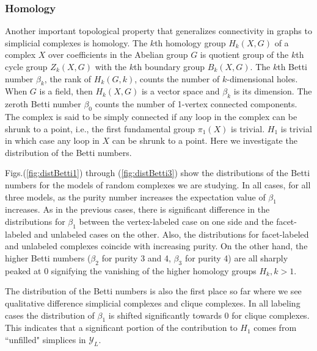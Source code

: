 \documentclass[12pt]{article}
\theoremstyle{plain}
\theoremstyle{definition}
\theoremstyle{remark}
\begin{document}
\subsubsection{Homology}
Another important topological property that generalizes connectivity in graphs to simplicial complexes is homology. The $k$th homology group $H_k(X,G)$ of a complex $X$ over coefficients in the Abelian group $G$ is quotient group of the $k$th cycle group $Z_k(X,G)$ with the $k$th boundary group $B_k(X,G)$. The $k$th Betti number $\beta_k$, the rank of $H_k(G,k)$, counts the number of $k$-dimensional holes. When $G$ is a field, then $H_k(X,G)$ is a vector space and $\beta_k$ is its dimension. The zeroth Betti number $\beta_0$ counts the number of 1-vertex connected components. The complex is said to be simply connected if any loop in the complex can be shrunk to a point, i.e., the first fundamental group $\pi_1(X)$ is trivial. $H_1$ is trivial in which case any loop in $X$ can be shrunk to a point. Here we investigate the distribution of the Betti numbers. %

Figs.(\ref{fig:distBetti1}) through (\ref{fig:distBetti3}) show the distributions of the Betti numbers for the models of random complexes we are studying. In all cases, for all three models, as the purity number increases the expectation value of $\beta_1$ increases. As in the previous cases, there is significant difference in the distributions for $\beta_1$ between the vertex-labeled case on one side and the facet-labeled and unlabeled cases on the other. Also, the distributions for facet-labeled and unlabeled complexes coincide with increasing purity. On the other hand, the higher Betti numbers ($\beta_2$ for purity 3 and 4, $\beta_3$ for purity 4) are all sharply peaked at 0 signifying the vanishing of the higher homology groups $H_k, k>1$. 

The distribution of the Betti numbers is also the first place so far where we see qualitative difference  simplicial complexes and clique complexes. In all labeling cases the distribution of $\beta_1$ is shifted significantly towards 0 for clique complexes. This indicates that a significant portion of the contribution to $H_1$ comes from ``unfilled" simplices in $\mathcal{Y}_L$.
\end{document}
